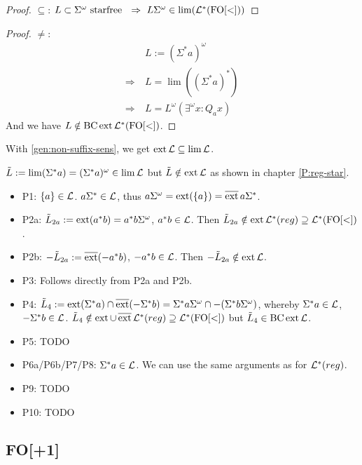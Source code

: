 \begin{proof}
$\subseteq$: $L \subset \Sigma^\omega \text{ starfree } \ \Rightarrow\ L \Sigma^\omega \in \lim( \Lang^*( \mathrm{FO[<]} ) )$
\end{proof}
\begin{proof}
$\neq$:
\begin{align*}
& L := (\Sigma^* a)^\omega \\
\Rightarrow \ & L = \lim( (\Sigma^* a)^* ) \\
\Rightarrow \ & L = L^\omega(\exists^\omega x : Q_a x)
\end{align*}
And we have $L \notin \operatorname{BC} \operatorname{ext} \mathcal{L}^* (\mathrm{FO[<]})$.
\end{proof}

With \ref{gen:non-suffix-sens}, we get $\operatorname{ext} \mathcal{L} \subseteq \lim \mathcal{L}$.

$\tilde{L} := \lim(\Sigma^* a) = (\Sigma^* a)^\omega \in \lim \mathcal{L}$ but $\tilde{L} \notin \operatorname{ext} \mathcal{L}$ as shown in chapter \ref{P:reg-star}.

\begin{itemize}
\item P1: $\Set{a} \in \Lang$. $a \Sigma^* \in \mathcal{L}$, thus $a\Sigma^\omega = \ext(\Set{a}) = \dext{a\Sigma^*}$.
\item P2a: $\tilde{L}_{2a} := \operatorname{ext} (a^* b) = a^* b \Sigma^\omega$, $a^* b \in \mathcal{L}$. Then $\tilde{L}_{2a} \notin \operatorname{ext} \mathcal{L}^*(reg) \supseteq \mathcal{L}^*( \mathrm{FO[<]} )$.
\item P2b: $-\tilde{L}_{2a} := \operatorname{\overline{ext}} (-a^* b)$, $-a^* b \in \mathcal{L}$. Then $-\tilde{L}_{2a} \notin \operatorname{ext} \mathcal{L}$.
\item P3: Follows directly from P2a and P2b.
\item P4: $\tilde{L}_4 := \operatorname{ext}(\Sigma^* a) \cap \operatorname{\overline{ext}}(-\Sigma^* b) = \Sigma^* a \Sigma^\omega \cap -(\Sigma^* b \Sigma^\omega)$, whereby $\Sigma^* a \in \mathcal{L}$, $- \Sigma^* b \in \mathcal{L}$. $\tilde{L}_4 \notin \operatorname{ext} \cup \operatorname{\overline{ext}} \mathcal{L}^*(reg) \supseteq \mathcal{L}^*( \mathrm{FO[<]} )$ but $\tilde{L}_4 \in \operatorname{BC} \operatorname{ext} \mathcal{L}$.
\item P5: TODO
\item P6a/P6b/P7/P8: $\Sigma^*a \in \mathcal{L}$. We can use the same arguments as for $\mathcal{L}^*(reg)$.
\item P9: TODO
\item P10: TODO
\end{itemize}

\subsection{FO[+1]}

